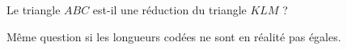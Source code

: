
\begin{exercice}\label{exo2smath-0240}

Le triangle \( ABC\) est-il une réduction du triangle \( KLM\) ?

\begin{center}
   
\end{center}


Même question si les longueurs codées ne sont en réalité pas égales.

\end{exercice}
